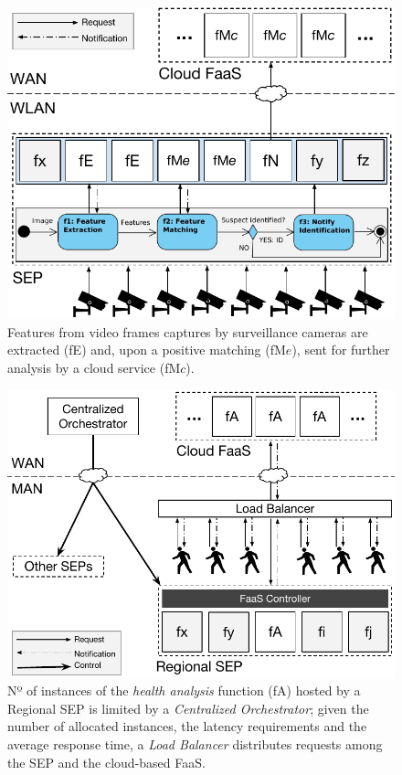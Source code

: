 \begin{figure}[bp]
	\centering
	\includegraphics[width=\linewidth]{Figs/Edge_Data_Analytics_Video_Surveillance.pdf}
	\caption{Features from video frames captures by surveillance cameras are extracted (fE) and, upon a positive matching (fM$e$), sent for further analysis by a cloud service (fM$c$).}
	\label{fig:Edge_Data_Analytics_Video_Surveillance}
\end{figure}

\begin{figure}[bp]
	\centering
	\includegraphics[width=\linewidth]{Figs/Edge_Data_Analytics_Personal_Assistant.pdf}
	\caption{Nº of instances of the \textit{health analysis} function (fA) hosted by a Regional SEP is limited by a \textit{Centralized Orchestrator}; given the number of allocated instances, the latency requirements and the average response time, a \textit{Load Balancer} distributes requests among the SEP and the cloud-based FaaS.}
	\label{fig:Edge_Data_Analytics_Personal_Assistant}
\end{figure}




